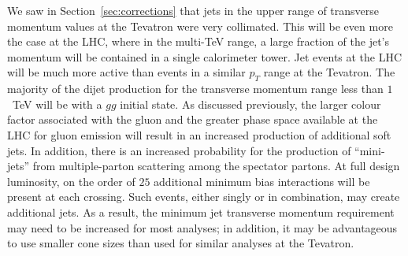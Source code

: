 \documentclass[12pt]{iopart}
\begin{document}
We saw in Section~\ref{sec:corrections} that jets in the upper range of transverse momentum values at the Tevatron were very collimated. This will be even more the case at the LHC, where in the multi-TeV range, a large fraction of the jet's momentum will be contained in a single calorimeter tower. 
Jet events at the LHC will be much more active than events in a similar $p_T$ range at the Tevatron. The
majority of the dijet production for the transverse momentum range less than $1$~TeV will be with a $gg$ 
initial state. As discussed previously, the larger colour factor associated with the gluon and the greater
phase space available at the LHC for gluon emission  will result in an increased production of additional soft
jets. In addition, there is an increased probability for the production of ``mini-jets'' from multiple-parton
scattering among the spectator partons. At full design luminosity, on the order of $25$ additional minimum bias interactions
will be present at each crossing. Such events, either singly or in combination, may create additional jets. As a result,
the minimum jet transverse momentum requirement may need to be increased for most analyses; in addition, it may be
advantageous to use smaller cone sizes than used for similar analyses at the Tevatron. 
\end{document}
